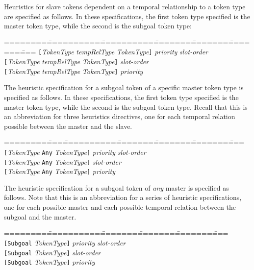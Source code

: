 Heuristics for slave tokens dependent on a temporal
relationship to a token type are specified as follows.  In these
specifications, the first token type specified is the master token
type, while the second is the subgoal token type:

\begin{tabbing}
========\===========\===========\========\========\========\====\kill
{\tt[}{\em TokenType} \> {\em tempRelType} \>    {\em TokenType}{\tt]} \> {\em priority} \> {\em slot-order}\\
{\tt[}{\em TokenType} \> {\em tempRelType} \>    {\em TokenType}{\tt]} \> {\em slot-order}\\
{\tt[}{\em TokenType} \> {\em tempRelType} \>    {\em TokenType}{\tt]} \> {\em priority}\\
\end{tabbing}


The heuristic specification for a subgoal token of a specific master
token type is specified as follows.  In these specifications, the
first token type specified is the master token type, while the second
is the subgoal token type.  Recall that this is an abbreviation for
three heuristics directives, one for each temporal relation possible
between the master and the slave.

\begin{tabbing}
========\====\===========\========\========\========\====\kill
{\tt[}{\em TokenType} \>  {\tt Any} \>    {\em TokenType}{\tt]} \> {\em priority} \> {\em slot-order}\\
{\tt[}{\em TokenType} \>  {\tt Any} \>    {\em TokenType}{\tt]} \> {\em slot-order}\\
{\tt[}{\em TokenType} \>  {\tt Any} \>    {\em TokenType}{\tt]} \> {\em priority}\\
\end{tabbing}



The heuristic specification for a subgoal token of {\em any} master is
specified as follows.  Note that this is an abbreviation for a series
of heuristic specifications, one for each possible master and each
possible temporal relation between the subgoal and the master.

\begin{tabbing}
========\===========\========\========\========\====\kill
{\tt[Subgoal} \>    {\em TokenType}{\tt]} \> {\em priority} \> {\em slot-order}\\
{\tt[Subgoal} \>    {\em TokenType}{\tt]} \> {\em slot-order}\\
{\tt[Subgoal} \>    {\em TokenType}{\tt]} \> {\em priority}\\
\end{tabbing}


